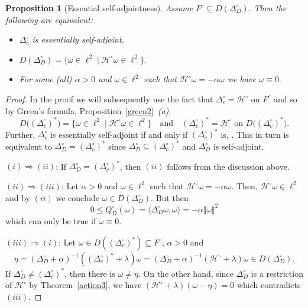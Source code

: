 \documentclass[10pt]{amsart}
\newtheorem{proposition}[theorem]{Proposition}
\theoremstyle{definition}
\renewcommand{\bullet}{{\circ}}
\begin{document}
\begin{proposition}[Essential self-adjointness]\label{essSA}
Assume $F^c\subseteq D(\Delta^\bullet_{D}).$ Then the following are equivalent:
    \begin{itemize}
        \item[(i)] $\Delta^\bullet_{c}$ is essentially self-adjoint.
        \item[(ii)] $D(\Delta^\bullet_{D}) = \lbrace \omega\in\ell^2\mid\mathcal{H}^\bullet\omega\in\ell^2\rbrace.$
        \item[(iii)] For some (all) $\alpha>0$ and $\omega\in\ell^2$ such that $\mathcal{H}^\bullet \omega= -\alpha \omega$ we have $\omega\equiv 0.$
    \end{itemize}
\end{proposition}
\begin{proof}
In the proof we will subsequently use the fact that $\Delta^\bullet_c = \mathcal{H^\bullet}$ on $F^c$ and so by Green's formula, Proposition~\ref{green2}~\emph{(a)},
  $$D\big((\Delta^\bullet_{c})^*\big) =  \lbrace \omega\in\ell^2\mid\mathcal{H}^\bullet\omega\in\ell^2\rbrace \quad \mbox{and}\quad (\Delta^\bullet_{c})^*=\mathcal{H}^{\bullet}\;\mbox{on }D\big((\Delta^\bullet_{c})^*\big).$$
Further, $\Delta^\bullet_{c}$ is essentially self-adjoint if and only if $(\Delta^\bullet_{c})^*$ is, \cite[Theorem~5.20]{W}. This in turn 
is equivalent to $ \Delta^\bullet_{D}= (\Delta^\bullet_{c})^*$ since 
$  \Delta^\bullet_{D}\subseteq (\Delta^\bullet_{c})^*$ and $ \Delta^\bullet_{D}$ is self-adjoint.

   $(i)\Rightarrow(ii)$: If 
   $  \Delta^\bullet_{D}= (\Delta^\bullet_{c})^*$, then $(ii)$ follows from the discussion above.

    $(ii)\Rightarrow(iii)$: Let $\alpha>0$ and $\omega\in\ell^2$ such that $\mathcal{H}^\bullet \omega = -\alpha \omega$. Then, $\mathcal{H}^\bullet \omega\in\ell^2$ and by $(ii)$ we conclude  $\omega\in D(\Delta^\bullet_{D}).$ But then
    $$0\leq Q^\bullet_{D}(\omega) = \langle\Delta^\bullet_D \omega,\omega\rangle = -\alpha\Vert \omega\Vert^2$$
    which can only be true if $\omega\equiv 0.$
    
      $(iii)\Rightarrow(i)$:  
      Let $\omega\in D((\Delta^\bullet_{c})^*)\subseteq F^{\bullet}$, $\alpha>0$ and
      $$\eta = (\Delta^\bullet_{D}+\alpha)^{-1}((\Delta^\bullet_{c})^*+\lambda)\omega= (\Delta^\bullet_{D}+\alpha)^{-1}(\mathcal{H}^\bullet+\lambda)\omega\in D(\Delta^\bullet_{D}).$$ 
      If $ \Delta^\bullet_{D}\neq (\Delta^\bullet_{c})^*$, then there is  $\omega\neq \eta$. On the other hand,  since $\Delta_{D}^{\bullet}$ is a restriction of $\mathcal{H}^{\bullet}$ by Theorem~\ref{action3},  we have
      $(\mathcal{H}^\bullet+\lambda)(\omega-\eta) = 0$ which contradicts $(iii)$.%
\end{proof}
\end{document}
